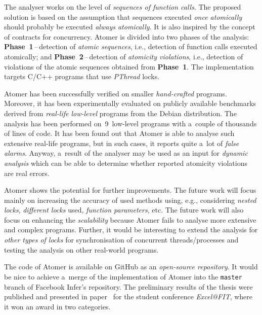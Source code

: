 The analyser works on the level of \emph{sequences of function calls}. The
proposed solution is based on the assumption that sequences executed
\emph{once atomically} should probably be executed \emph{always atomically}.
It is also inspired by the concept of contracts for concurrency. Atomer
is divided into two phases of the analysis: \textbf{Phase~1}\,--\,detection
of \emph{atomic sequences}, i.e., detection of function calls executed
atomically; and \textbf{Phase~2}\,--\,detection of \emph{atomicity
violations}, i.e., detection of violations of the atomic sequences
obtained from \textbf{Phase~1}. The implementation targets C/C++ programs
that use \emph{PThread} locks.

Atomer has been successfully verified on smaller \emph{hand-crafted}
programs. Moreover, it has been experimentally evaluated on publicly
available benchmarks derived from \emph{real-life low-level} programs
from the Debian distribution. The analysis has been performed
on~9~low-level programs with a~couple of thousands of lines of code.
It has been found out that Atomer is able to analyse such extensive
real-life programs, but in such cases, it reports quite a~lot of
\emph{false alarms}. Anyway, a~result of the analyser may be used as an
input for \emph{dynamic analysis} which can be able to determine whether
reported atomicity violations are real errors.

Atomer shows the potential for further improvements. The future work will
focus mainly on increasing the accuracy of used methods using, e.g.,
considering \emph{nested locks}, \emph{different locks} used,
\emph{function parameters}, etc. The future work will also focus
on enhancing the \emph{scalability} because Atomer fails to analyse more
extensive and complex programs. Further, it would be interesting to
extend the analysis for \emph{other types of locks} for synchronisation
of concurrent threads/processes and testing the analysis on other
real-world programs.

The code of Atomer is available on GitHub as an \emph{open-source
repository}. It would be nice to achieve a~merge of the implementation
of Atomer into the \texttt{master} branch of Facebook Infer's repository.
The preliminary results of the thesis were published and presented in
paper~\cite{excel2019FBInfer} for the student conference \emph{Excel@FIT},
where it won an award in two categories.

\enlargethispage{1em}



